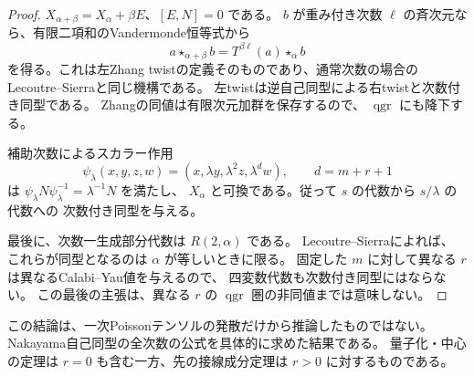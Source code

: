 \begin{proof}
$X_{\alpha+\beta}=X_\alpha+\beta E$、$[E,N]=0$ である。
$b$ が重み付き次数 $\ell$ の斉次元なら、有限二項和のVandermonde恒等式から
\[
 a\star_{\alpha+\beta}b
       =T^{\beta\ell}(a)\star_\alpha b
\]
を得る。これは左Zhang twistの定義そのものであり、通常次数の場合の
Lecoutre--Sierra\cite[Theorem 4.2]{LecoutreSierra2019}と同じ機構である。
左twistは逆自己同型による右twistと次数付き同型である。
Zhangの同値\cite[Theorem 1.1]{Zhang1996}は有限次元加群を保存するので、
$\operatorname{qgr}$ にも降下する。

補助次数によるスカラー作用
\[
 \psi_\lambda(x,y,z,w)=(x,\lambda y,\lambda^2z,\lambda^d w),
 \qquad d=m+r+1
\]
は $\psi_\lambda N\psi_\lambda^{-1}=\lambda^{-1}N$ を満たし、
$X_\alpha$ と可換である。従って $s$ の代数から $s/\lambda$ の代数への
次数付き同型を与える。

最後に、次数一生成部分代数は $R(2,\alpha)$ である。
Lecoutre--Sierra\cite[Theorem 5.1]{LecoutreSierra2019}によれば、
これらが同型となるのは $\alpha$ が等しいときに限る。
固定した $m$ に対して異なる $r$ は異なるCalabi--Yau値を与えるので、
四変数代数も次数付き同型にはならない。
この最後の主張は、異なる $r$ の $\operatorname{qgr}$ 圏の非同値までは意味しない。
\end{proof}

この結論は、一次Poissonテンソルの発散だけから推論したものではない。
Nakayama自己同型の全次数の公式を具体的に求めた結果である。
量子化・中心の定理は $r=0$ も含む一方、先の接線成分定理は $r>0$ に対するものである。
